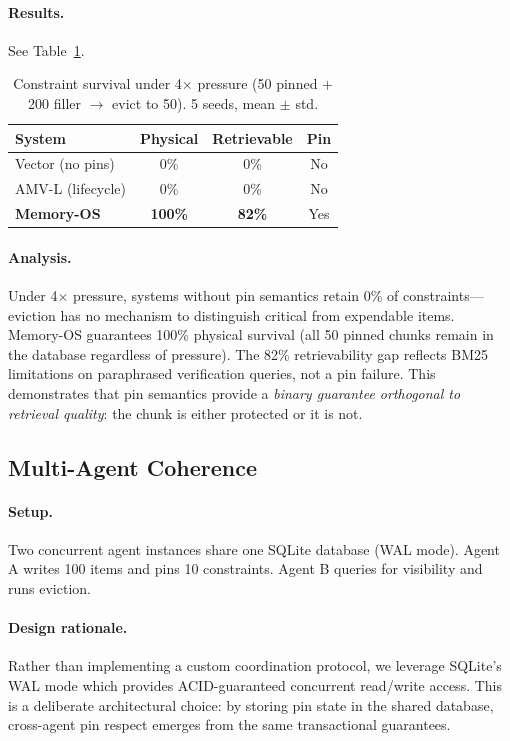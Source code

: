\documentclass[10pt,twocolumn]{article}
\begin{document}
\paragraph{Results.} See Table~\ref{tab:survival}.

\begin{table}[!htb]
\centering
\caption{Constraint survival under 4$\times$ pressure (50 pinned + 200 filler $\to$ evict to 50). 5 seeds, mean $\pm$ std.}
\label{tab:survival}
\small
\begin{tabular}{lccc}
\toprule
System & Physical & Retrievable & Pin \\
\midrule
Vector (no pins)      & 0\%              & 0\%              & No \\
AMV-L (lifecycle)     & 0\%              & 0\%              & No \\
\textbf{Memory-OS}    & \textbf{100\%}   & \textbf{82\%}    & Yes \\
\bottomrule
\end{tabular}
\end{table}

\paragraph{Analysis.} Under 4$\times$ pressure, systems without pin semantics retain 0\% of constraints---eviction has no mechanism to distinguish critical from expendable items. Memory-OS guarantees 100\% physical survival (all 50 pinned chunks remain in the database regardless of pressure). The 82\% retrievability gap reflects BM25 limitations on paraphrased verification queries, not a pin failure. This demonstrates that pin semantics provide a \emph{binary guarantee orthogonal to retrieval quality}: the chunk is either protected or it is not.

\subsection{Multi-Agent Coherence}

\paragraph{Setup.} Two concurrent agent instances share one SQLite database (WAL mode). Agent A writes 100 items and pins 10 constraints. Agent B queries for visibility and runs eviction.

\paragraph{Design rationale.} Rather than implementing a custom coordination protocol, we leverage SQLite's WAL mode which provides ACID-guaranteed concurrent read/write access. This is a deliberate architectural choice: by storing pin state in the shared database, cross-agent pin respect emerges from the same transactional guarantees.
\end{document}
